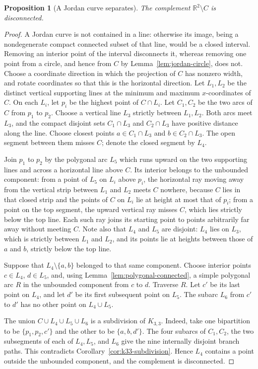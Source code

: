 \documentclass[11pt]{article}
\theoremstyle{mainplain}
\newtheorem{proposition}[theorem]{Proposition}
\theoremstyle{mainroman}
\theoremstyle{definition}
\numberwithin{equation}{section}
\begin{document}
\begin{proposition}[A Jordan curve separates]\label{prop:jordan-disconnected}
The complement $\mathbb R^2\setminus C$ is disconnected.
\end{proposition}
\begin{proof}
A Jordan curve is not contained in a line: otherwise its image,
being a nondegenerate compact connected subset of that line, would be
a closed interval. Removing an interior point of the interval
disconnects it, whereas removing one point from a circle, and hence
from $C$ by Lemma~\ref{lem:jordan-circle}, does not.
Choose a coordinate direction in
which the projection of $C$ has nonzero width, and rotate coordinates
so that this is the horizontal direction. Let $L_1,L_2$ be the
distinct vertical supporting lines at the minimum and maximum
$x$-coordinates of $C$. On each $L_i$, let $p_i$ be the highest point
of $C\cap L_i$. Let $C_1,C_2$ be the two arcs of $C$ from
$p_1$ to $p_2$. Choose a vertical line $L_3$ strictly between
$L_1,L_2$. Both arcs meet $L_3$, and the compact disjoint sets
$C_1\cap L_3$ and $C_2\cap L_3$ have positive distance along the
line. Choose closest points $a\in C_1\cap L_3$ and
$b\in C_2\cap L_3$. The open segment between them misses $C$; denote
the closed segment by $L_4$.

Join $p_1$ to $p_2$ by the polygonal arc $L_5$ which runs upward on the
two supporting lines and across a horizontal line above $C$. Its
interior belongs to the unbounded component: from a point of $L_5$ on
$L_i$ above $p_i$, the horizontal ray moving away from the vertical
strip between $L_1$ and $L_2$ meets $C$ nowhere, because $C$ lies in
that closed strip and the points of $C$ on $L_i$ lie at height at most
that of $p_i$; from a point on the top segment, the upward vertical
ray misses $C$, which lies strictly below the top line. Each such ray
joins its starting point to points arbitrarily far away without
meeting $C$. Note also that $L_4$ and $L_5$ are disjoint: $L_4$ lies
on $L_3$, which is strictly between $L_1$ and $L_2$, and its points
lie at heights between those of $a$ and $b$, strictly below the top
line.

Suppose that
$L_4\setminus\{a,b\}$ belonged to that same component. Choose interior
points $c\in L_4$, $d\in L_5$, and, using
Lemma~\ref{lem:polygonal-connected}, a simple polygonal arc $R$ in the
unbounded component from $c$ to $d$. Traverse $R$. Let $c'$ be its
last point on $L_4$, and let $d'$ be its first subsequent point on
$L_5$. The subarc $L_6$ from $c'$ to $d'$ has no other point on
$L_4\cup L_5$.

The union $C\cup L_4\cup L_5\cup L_6$ is a subdivision of $K_{3,3}$.
Indeed, take one bipartition to be $\{p_1,p_2,c'\}$ and the other to be
$\{a,b,d'\}$. The four subarcs of $C_1,C_2$, the two subsegments of
each of $L_4,L_5$, and $L_6$ give the nine internally disjoint branch
paths. This contradicts Corollary~\ref{cor:k33-subdivision}. Hence
$L_4$ contains a point
outside the unbounded component, and the complement is disconnected.
\end{proof}
\end{document}
